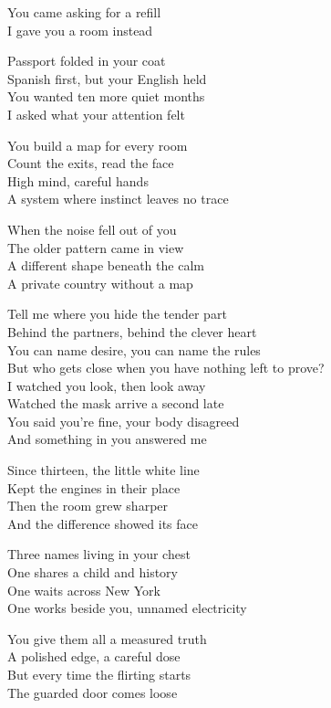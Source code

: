 \begin{lyrics}
You came asking for a refill\\
I gave you a room instead

Passport folded in your coat\\
Spanish first, but your English held\\
You wanted ten more quiet months\\
I asked what your attention felt

You build a map for every room\\
Count the exits, read the face\\
High mind, careful hands\\
A system where instinct leaves no trace

When the noise fell out of you\\
The older pattern came in view\\
A different shape beneath the calm\\
A private country without a map

Tell me where you hide the tender part\\
Behind the partners, behind the clever heart\\
You can name desire, you can name the rules\\
But who gets close when you have nothing left to prove?\\
I watched you look, then look away\\
Watched the mask arrive a second late\\
You said you’re fine, your body disagreed\\
And something in you answered me

Since thirteen, the little white line\\
Kept the engines in their place\\
Then the room grew sharper\\
And the difference showed its face

Three names living in your chest\\
One shares a child and history\\
One waits across New York\\
One works beside you, unnamed electricity

You give them all a measured truth\\
A polished edge, a careful dose\\
But every time the flirting starts\\
The guarded door comes loose


\end{lyrics}

